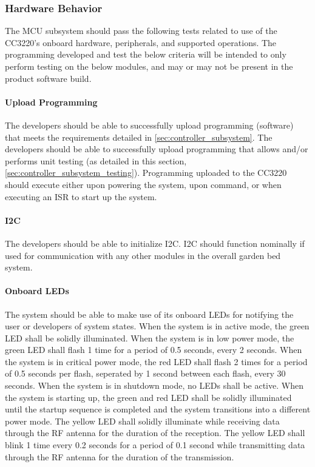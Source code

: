 \subsubsection{Hardware Behavior}
The MCU subsystem should pass the following tests related to use of the
CC3220's onboard hardware, peripherals, and supported operations. The
programming developed and test the below criteria will be intended to only
perform testing on the below modules, and may or may not be present in the
product software build.

\paragraph{Upload Programming} The developers should be able to successfully
upload programming (software) that meets the requirements detailed in
\autoref{sec:controller_subsystem}. The developers should be able to
successfully upload programming that allows and/or performs unit testing
(as detailed in this section, \autoref{sec:controller_subsystem_testing}).
Programming uploaded to the CC3220 should execute either upon powering the
system, upon command, or when executing an ISR to start up the system.

\paragraph{I2C} The developers should be able to initialize I2C. I2C should
function nominally if used for communication with any other modules in the
overall garden bed system.

\paragraph{Onboard LEDs} The system should be able to make use of its onboard
LEDs for notifying the user or developers of system states. 
When the system is in active mode, the green LED shall be solidly illuminated.
When the system is in low power mode, the green LED shall flash 1 time for a
period of 0.5 seconds, every 2 seconds. When the system is in critical power
mode, the red LED shall flash 2 times for a period of 0.5 seconds per flash,
seperated by 1 second between each flash, every 30 seconds. When the system is
in shutdown mode, no LEDs shall be active. When the system is starting up, the
green and red LED shall be solidly illuminated until the startup sequence is
completed and the system transitions into a different power mode. The yellow
LED shall solidly illuminate while receiving data through the RF antenna for
the duration of the reception.
The yellow LED shall blink 1 time every 0.2 seconds for a period of 0.1 second
while transmitting data through the RF antenna for the duration of the
transmission.

